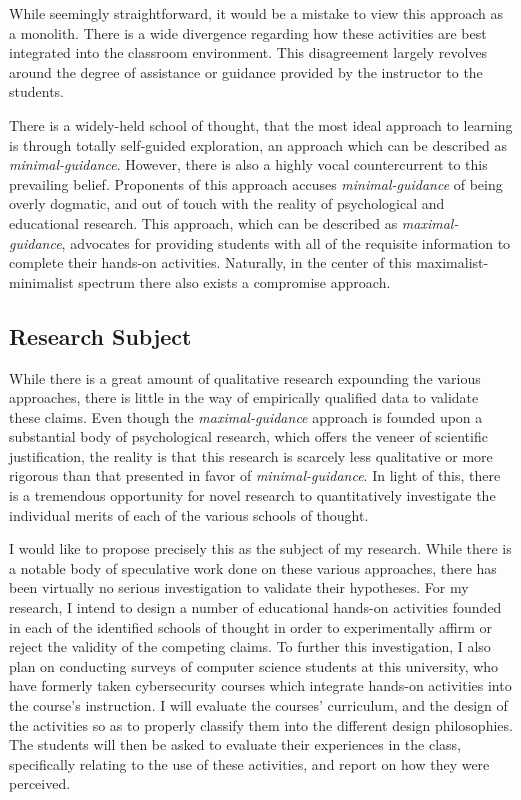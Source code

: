 \documentclass{article}
\begin{document}
    While seemingly straightforward, it would be a mistake to view this approach as a monolith. %
There is a wide divergence regarding how these activities are best integrated into the classroom environment. %
This disagreement largely revolves around the degree of assistance or guidance provided by the instructor to the students. 

    There is a widely-held school of thought, that the most ideal approach to learning is through totally self-guided exploration, an approach which can be described as \emph{minimal-guidance}. %
However, there is also a highly vocal countercurrent to this prevailing belief. %
Proponents of this approach accuses \emph{minimal-guidance} of being overly dogmatic, and out of touch with the reality of psychological and educational research. %
This approach, which can be described as \emph{maximal-guidance}, advocates for providing students with all of the requisite information to complete their hands-on activities. %
Naturally, in the center of this maximalist-minimalist spectrum there also exists a compromise approach.

    \subsection{Research Subject} 
        While there is a great amount of qualitative research expounding the various approaches, there is little in the way of empirically qualified data to validate these claims. %
Even though the \emph{maximal-guidance} approach is founded upon a substantial body of psychological research, which offers the veneer of scientific justification, the reality is that this research is scarcely less qualitative or more rigorous than that presented in favor of \emph{minimal-guidance}. %
In light of this, there is a tremendous opportunity for novel research to quantitatively investigate the individual merits of each of the various schools of thought.

        I would like to propose precisely this as the subject of my research. %
While there is a notable body of speculative work done on these various approaches, there has been virtually no serious investigation to validate their hypotheses. %
For my research, I intend to design a number of educational hands-on activities founded in each of the identified schools of thought in order to experimentally affirm or reject the validity of the competing claims. %
To further this investigation, I also plan on conducting surveys of computer science students at this university, who have formerly taken cybersecurity courses which integrate hands-on activities into the course's instruction. %
I will evaluate the courses' curriculum, and the design of the activities so as to properly classify them into the different design philosophies. %
The students will then be asked to evaluate their experiences in the class, specifically relating to the use of these activities, and report on how they were perceived. 
\end{document}
